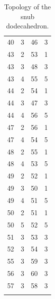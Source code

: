 \documentclass[a4paper, amsfonts, amssymb, amsmath, reprint, showkeys, nofootinbib, twoside]{revtex4-1}
\begin{document}
\begin{longtable}[h!]{ cccc }
	40 & 3 & 46 & 3 \\
	43 & 2 & 53 & 1 \\
	43 & 3 & 48 & 3 \\
	43 & 4 & 55 & 5 \\
	44 & 2 & 54 & 1 \\
	44 & 3 & 47 & 3 \\
	44 & 4 & 56 & 5 \\
	47 & 2 & 56 & 1 \\
	47 & 4 & 54 & 5 \\
	48 & 2 & 55 & 1 \\
	48 & 4 & 53 & 5 \\
	49 & 2 & 52 & 1 \\
	49 & 3 & 50 & 1 \\
	49 & 4 & 51 & 5 \\
	50 & 2 & 51 & 1 \\
	50 & 5 & 52 & 5 \\
	51 & 3 & 53 & 3 \\
	52 & 3 & 54 & 3 \\
	55 & 3 & 59 & 3 \\
	56 & 3 & 60 & 3 \\
	57 & 3 & 58 & 3 \\
	\hline
	\caption{Topology of the snub dodecahedron.}
\end{longtable}
\end{document}
